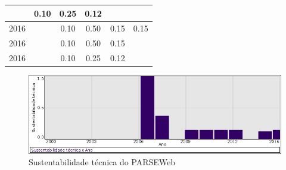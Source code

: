 \begin{table}[H]
\begin{tabular}{| l | c | c | c | c | c |}
          &
          0.10
          &
          0.25
          &
          0.12
          &
          \\
\hline
            2016
          &
          
          &
          0.10
          &
          0.50
          &
          0.15
          &
            {\color{red} 0.15}
          \\
            2016
          &
          
          &
          0.10
          &
          0.50
          &
          0.15
          &
          \\
            2016
          &
          
          &
          0.10
          &
          0.25
          &
          0.12
          &
          \\
\hline
\end{tabular}
\end{table}

\begin{figure}[h]
  \center
  \includegraphics[scale=0.50]{imagens/softwares-charts/parseweb.png}
  \caption{Sustentabilidade técnica do PARSEWeb}
\end{figure}


